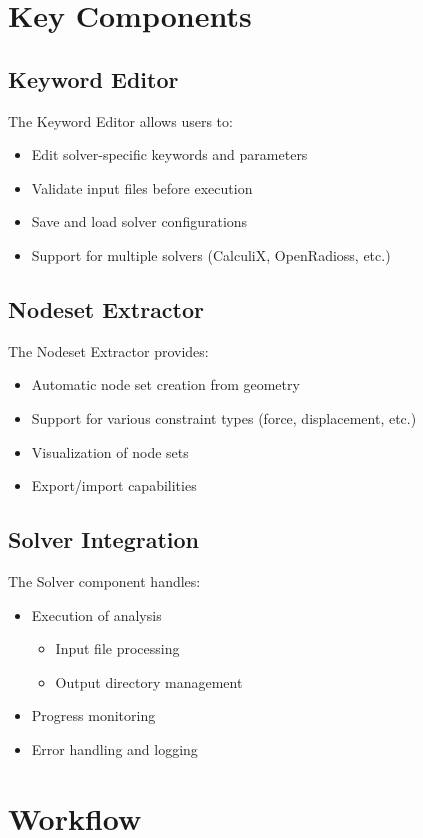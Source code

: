 \documentclass{article}
\begin{document}
\section{Key Components}

\subsection{Keyword Editor}
The Keyword Editor allows users to:
\begin{itemize}
    \item Edit solver-specific keywords and parameters
    \item Validate input files before execution
    \item Save and load solver configurations
    \item Support for multiple solvers (CalculiX, OpenRadioss, etc.)
\end{itemize}

\subsection{Nodeset Extractor}
The Nodeset Extractor provides:
\begin{itemize}
    \item Automatic node set creation from geometry
    \item Support for various constraint types (force, displacement, etc.)
    \item Visualization of node sets
    \item Export/import capabilities
\end{itemize}

\subsection{Solver Integration}
The Solver component handles:
\begin{itemize}
    \item Execution of analysis
    \begin{itemize}
        \item Input file processing
        \item Output directory management
    \end{itemize}
    \item Progress monitoring
    \item Error handling and logging
\end{itemize}

\section{Workflow}
\end{document}
